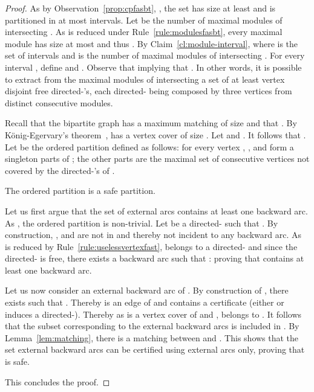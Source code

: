 \begin{proof}
As by Observation~\ref{prop:cpfasbt}, , the set  has size at least  and is partitioned in at most  intervals. Let  be the number of maximal modules of  intersecting . As  is reduced under Rule~\ref{rule:modulesfasbt}, every maximal module has size at most  and thus . By Claim~\ref{cl:module-interval},  where  is the set of intervals and  is the number of maximal modules of  intersecting . For every interval , define  and . Observe that  implying that . In other words, it is possible to extract from the maximal modules of  intersecting  a set  of at least  vertex disjoint free directed-'s, each directed- being composed by three vertices from distinct consecutive modules.

Recall that the bipartite graph has a maximum matching of size  and that . By K\"onig-Egervary's theorem~\cite{BM76},  has a vertex cover  of size . Let  and . It follows that . Let  be the ordered partition defined as follows: for every vertex , ,  and  form a singleton parts of ; the other parts are the maximal set of consecutive vertices not covered by the directed-'s of . 

\begin{claim} \label{cl:safe-partition}
The ordered partition  is a safe partition.
\end{claim}
\begin{proofclaim}
Let us first argue that the set  of external arcs contains at least one backward arc. As , the ordered partition  is non-trivial. Let  be a directed- such that . By construction, ,  and  are not in  and thereby not incident to any backward arc. As  is reduced by Rule~\ref{rule:uselessvertexfast},  belongs to a directed- and since the directed-  is free, there exists a backward arc  such that : proving that   contains at least one backward arc.

Let us now consider  an external backward arc of . By construction of , there exists  such that . Thereby  is an edge of  and  contains a certificate  (either  or  induces a directed-). Thereby as  is a vertex cover of  and ,  belongs to . It follows that the subset  corresponding to the external backward arcs is included in . By Lemma~\ref{lem:matching}, there is a matching between  and . This shows that the set external backward arcs can be certified using external arcs only, proving that  is safe.
\end{proofclaim}

This concludes the proof.
\end{proof}

